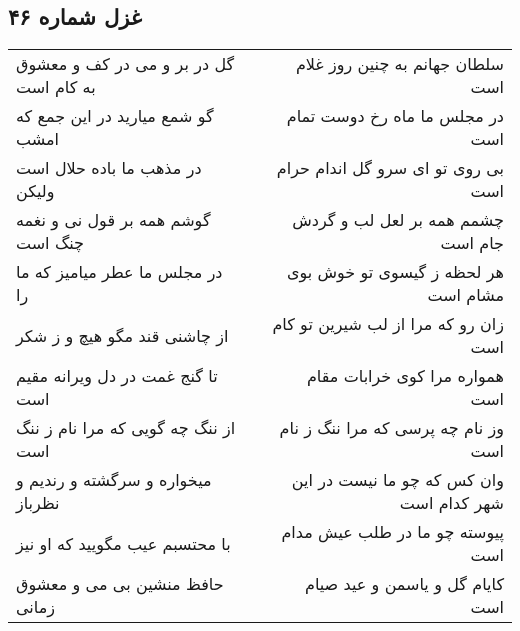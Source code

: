 \begin{center}
\section*{غزل شماره ۴۶}
\label{sec:sh046}
\begin{longtable}{l p{0.5cm} r}
گل در بر و می در کف و معشوق به کام است
&&
سلطان جهانم به چنین روز غلام است
\\
گو شمع میارید در این جمع که امشب
&&
در مجلس ما ماه رخ دوست تمام است
\\
در مذهب ما باده حلال است ولیکن
&&
بی روی تو ای سرو گل اندام حرام است
\\
گوشم همه بر قول نی و نغمه چنگ است
&&
چشمم همه بر لعل لب و گردش جام است
\\
در مجلس ما عطر میامیز که ما را
&&
هر لحظه ز گیسوی تو خوش بوی مشام است
\\
از چاشنی قند مگو هیچ و ز شکر
&&
زان رو که مرا از لب شیرین تو کام است
\\
تا گنج غمت در دل ویرانه مقیم است
&&
همواره مرا کوی خرابات مقام است
\\
از ننگ چه گویی که مرا نام ز ننگ است
&&
وز نام چه پرسی که مرا ننگ ز نام است
\\
میخواره و سرگشته و رندیم و نظرباز
&&
وان کس که چو ما نیست در این شهر کدام است
\\
با محتسبم عیب مگویید که او نیز
&&
پیوسته چو ما در طلب عیش مدام است
\\
حافظ منشین بی می و معشوق زمانی
&&
کایام گل و یاسمن و عید صیام است
\\
\end{longtable}
\end{center}
